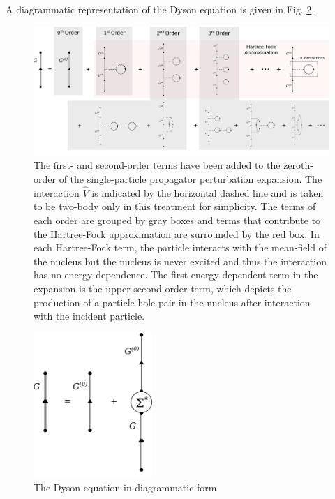 \noindent
A diagrammatic representation of the Dyson equation is given in Fig. \ref{DysonEquationDiagram}.
\begin{figure}
    \centering
    \includegraphics[width=\textwidth]{figures/SecondOrder.png}
    \caption[The single-particle propagator perturbation expansion, to second order]
    {The first- and second-order terms have been added to the zeroth-order of the
        single-particle propagator perturbation expansion.
        The interaction $\hat{V}$ is indicated by the horizontal
        dashed line and is taken to be two-body only in this treatment for simplicity.
        The terms of each order are grouped by gray boxes and terms that contribute to
        the Hartree-Fock approximation are surrounded by the red box. In each Hartree-Fock
        term, the particle interacts with the mean-field of the nucleus but
        the nucleus is never excited and thus the interaction has no energy dependence. The first
        energy-dependent term in the expansion is the upper second-order term, which depicts
        the production of a particle-hole pair in the nucleus after interaction with the
        incident particle.}
    \label{PerturbationExpansionDiagram}
\end{figure}

\begin{figure}[ht!]
    \centering
    \includegraphics[width=0.4\textwidth]{figures/DysonEquation.png}
    \caption{The Dyson equation in diagrammatic form}
    \label{DysonEquationDiagram}
\end{figure}

